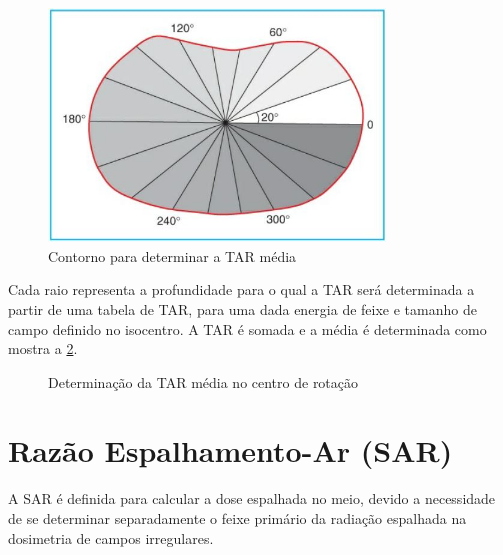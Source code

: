 \documentclass[11pt,a4paper]{article}
\begin{document}
	\begin{figure}[h]
		\centering
		\includegraphics[width=0.8\textwidth]{Imagens/tarArco.JPG}
		\caption{Contorno para determinar a TAR média}
		\label{fig:tarArco}                
	\end{figure}

	Cada raio representa a profundidade para o qual a TAR será determinada a partir de uma tabela de TAR, para uma dada energia de feixe e tamanho de campo definido no isocentro. A TAR é somada e a média é determinada como mostra a \ref{fig:tabelaTarArco}.


	\begin{figure}[h]
		\centering
		\caption{Determinação da TAR média no centro de rotação}
		\label{fig:tabelaTarArco}
	  \end{figure}


	\section{Razão Espalhamento-Ar (SAR)}

	A SAR é definida para calcular a dose espalhada no meio, devido a necessidade de se determinar separadamente o feixe primário da radiação espalhada na dosimetria de campos irregulares.
\end{document}
